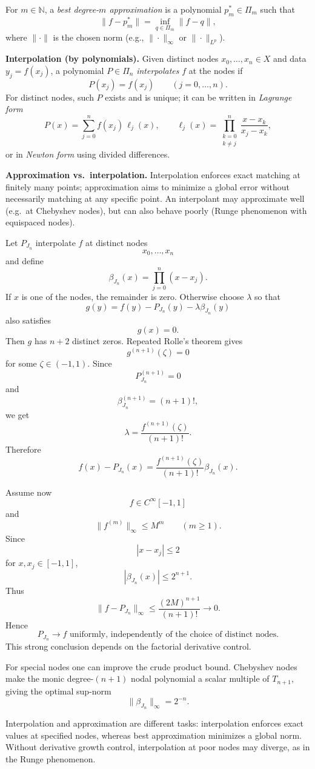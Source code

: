 \begin{problem}[CP-II-0340]
For $m\in\mathbb{N}$, a \emph{best degree-$m$ approximation} is a polynomial
$p_m^*\in\Pi_m$ such that
\[
\|f-p_m^*\|=\inf_{q\in\Pi_m}\|f-q\|,
\]
where $\|\cdot\|$ is the chosen norm (e.g., $\|\cdot\|_\infty$ or $\|\cdot\|_{L^p}$).

\bigskip

\noindent\textbf{Interpolation (by polynomials).}
Given distinct nodes $x_0,\dots,x_n\in X$ and data $y_j=f(x_j)$,
a polynomial $P\in\Pi_n$ \emph{interpolates} $f$ at the nodes if
\[
P(x_j)=f(x_j)\qquad (j=0,\dots,n).
\]
For distinct nodes, such $P$ exists and is unique; it can be written in
\emph{Lagrange form}
\[
P(x)=\sum_{j=0}^n f(x_j)\,\ell_j(x),\qquad
\ell_j(x)=\prod_{\substack{k=0\\ k\ne j}}^n \frac{x-x_k}{x_j-x_k},
\]
or in \emph{Newton form} using divided differences.

\bigskip

\noindent\textbf{Approximation vs.\ interpolation.}
Interpolation enforces exact matching at finitely many points; approximation aims to minimize a global error without necessarily matching at any specific point. An interpolant may approximate well (e.g.\ at Chebyshev nodes), but can also behave poorly (Runge phenomenon with equispaced nodes).
\end{problem}

\begin{solution}
Let \(P_{J_n}\) interpolate \(f\) at distinct nodes
\[
x_0,\ldots,x_n
\]
and define
\[
\beta_{J_n}(x)
=
\prod_{j=0}^{n}(x-x_j).
\]
If \(x\) is one of the nodes, the remainder is zero. Otherwise choose \(\lambda\) so that
\[
g(y)
=
f(y)-P_{J_n}(y)-\lambda\beta_{J_n}(y)
\]
also satisfies
\[
g(x)=0.
\]
Then \(g\) has \(n+2\) distinct zeros. Repeated Rolle's theorem gives
\[
g^{(n+1)}(\zeta)=0
\]
for some \(\zeta\in(-1,1)\). Since
\[
P_{J_n}^{(n+1)}=0
\]
and
\[
\beta_{J_n}^{(n+1)}=(n+1)!,
\]
we get
\[
\lambda
=
\frac{f^{(n+1)}(\zeta)}{(n+1)!}.
\]
Therefore
\[
\boxed{
f(x)-P_{J_n}(x)
=
\frac{f^{(n+1)}(\zeta)}{(n+1)!}
\beta_{J_n}(x).
}
\]

Assume now
\[
f\in C^\infty[-1,1]
\]
and
\[
\|f^{(m)}\|_\infty\le M^m
\qquad(m\ge1).
\]
Since
\[
|x-x_j|\le2
\]
for \(x,x_j\in[-1,1]\),
\[
|\beta_{J_n}(x)|
\le
2^{n+1}.
\]
Thus
\[
\|f-P_{J_n}\|_\infty
\le
\frac{(2M)^{n+1}}{(n+1)!}
\longrightarrow0.
\]
Hence
\[
\boxed{
P_{J_n}\to f
\text{ uniformly, independently of the choice of distinct nodes}.
}
\]
This strong conclusion depends on the factorial derivative control.

For special nodes one can improve the crude product bound. Chebyshev nodes make the monic
degree-\((n+1)\) nodal polynomial a scalar multiple of \(T_{n+1}\), giving the optimal
sup-norm
\[
\|\beta_{J_n}\|_\infty
=
2^{-n}.
\]

Interpolation and approximation are different tasks: interpolation enforces exact values at
specified nodes, whereas best approximation minimizes a global norm. Without derivative
growth control, interpolation at poor nodes may diverge, as in the Runge phenomenon.
\end{solution}


